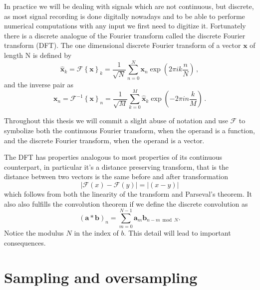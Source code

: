 In practice we will be dealing with signals which are not continuous, but
discrete, as most signal recording is done digitally nowadays and to be able to
performe numerical computations with any input we first need to digitize
it. Fortunately there is a discrete analogue of the Fourier transform called
the discrete Fourier transform (DFT). The one dimensional discrete Fourier
transform of a vector $\mathbf x$ of length N is defined by
\begin{equation}
\hat{\mathbf x}_k = \mathscr{F}\left\{ \mathbf x\right\}_k = \frac{1}{\sqrt{N}} \sum
\limits_{n=0}^{N} \mathbf x_n \exp\left(2 \pi i k \frac{n}{N}\right) \, ,
\end{equation}
and the inverse pair as
\begin{equation}
{\mathbf x}_n = \mathscr{F}^{-1}\left\{ \mathbf x\right\}_n = \frac{1}{\sqrt{M}} \sum
\limits_{k=0}^{M} \hat{\mathbf x}_k \exp\left(-2 \pi i n \frac{k}{M}\right) \, .
\end{equation}

Throughout this thesis we will commit a slight abuse of notation and use
$\mathscr{F}$ to symbolize both the continuous Fourier transform, when the
operand is a function, and the discrete Fourier transform, when the operand is a
vector.
 
The DFT has properties analogous to most properties of its continuous
counterpart, in particular it's a distance preserving transform, that is the distance between two vectors is the same before and after transformation
\begin{equation}
  |\mathscr{F}(x)-\mathscr{F}(y)| = |(x-y)|
\end{equation}
which follows from both the linearity of the transform and Parseval's theorem.
It also also fulfills the convolution theorem if we define the discrete
convolution as
\begin{equation}
  (\mathbf a * \mathbf b)_n = \sum \limits_{m = 0}^{N-1} \mathbf a_m 
  \mathbf  b_{n-m \bmod N} .
\end{equation}
Notice the modulus $N$ in the index of $b$. This detail will lead to important
consequences.

\section{Sampling and oversampling}


